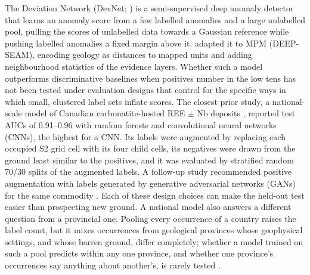 \documentclass[pdflatex,sn-apa]{sn-jnl}
\begin{document}
The Deviation Network (DevNet; \citealp{Pang2019}) is a semi-supervised deep anomaly detector that learns an anomaly score from a few labelled anomalies and a large unlabelled pool, pulling the scores of unlabelled data towards a Gaussian reference while pushing labelled anomalies a fixed margin above it. \citet{Luo2026} adapted it to MPM (DEEP-SEAM), encoding geology as distances to mapped units and adding neighbourhood statistics of the evidence layers. Whether such a model outperforms discriminative baselines when positives number in the low tens has not been tested under evaluation designs that control for the specific ways in which small, clustered label sets inflate scores. The closest prior study, a national-scale model of Canadian carbonatite-hosted REE $\pm$ Nb deposits \citep{Parsa2024}, reported test AUCs of 0.91--0.96 with random forests and convolutional neural networks (CNNs), the highest for a CNN. Its labels were augmented by replacing each occupied S2 grid cell with its four child cells, its negatives were drawn from the ground least similar to the positives, and it was evaluated by stratified random 70/30 splits of the augmented labels. A follow-up study recommended positive augmentation with labels generated by generative adversarial networks (GANs) for the same commodity \citep{Parsa2025}. Each of these design choices can make the held-out test easier than prospecting new ground. A national model also answers a different question from a provincial one. Pooling every occurrence of a country raises the label count, but it mixes occurrences from geological provinces whose geophysical settings, and whose barren ground, differ completely; whether a model trained on such a pool predicts within any one province, and whether one province's occurrences say anything about another's, is rarely tested \citep{Ploton2020,Meyer2021}.
\end{document}

